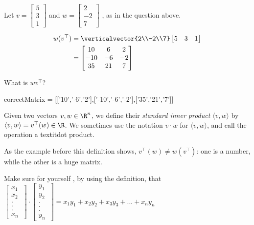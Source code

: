 \begin{question}
		Let $v = \begin{bmatrix}  5 \\ 3 \\ 1\end{bmatrix}$ and $w = \begin{bmatrix}  2 \\ -2 \\ 7\end{bmatrix}$ , as in the question above.
	\begin{solution}
	\begin{hint}
		 \begin{align*}
		 w(v^\top) &=  \verticalvector{2\\-2\\7}\begin{bmatrix} 5 & 3 & 1\end{bmatrix}\\
		 	&=\begin{bmatrix}
		 		10  & 6 & 2\\
		 		-10 & -6& -2\\
		 		35  & 21& 7
		 	\end{bmatrix}
		 \end{align*}
	\end{hint}
	   What is $wv^\top$? 
	   	\begin{matrix-answer}
	   		correctMatrix = [['10','-6','2'],['-10','-6','-2'],['35','21','7']]
	   	\end{matrix-answer}
	\end{solution}
\end{question}



\begin{definition}
	Given two vectors $v,w \in \R^n$, we define their \textit{standard inner product} $\langle v, w\rangle$ by $\langle v,w \rangle = v^\top(w) \in \R$.  We sometimes use the notation 
	$v \cdot w$ for $\langle v , w \rangle$, and call the operation a textit{dot product}. 
\end{definition}

\begin{warning}
	As the example before this definition shows, $v^\top(w) \neq w(v^\top)$:  one is a number, while the other is a huge matrix.
\end{warning}


\begin{question}
	Make sure for yourself , by using the definition, that 
	$\begin{bmatrix} x_1 \\x_2\\ .\\.\\. \\ x_n\ \end{bmatrix} \cdot \begin{bmatrix} y_1 \\y_2\\ .\\.\\. \\ y_n\ \end{bmatrix}  = x_1y_1+x_2y_2+x_3y_3 + ...+x_ny_n$
\end{question}


